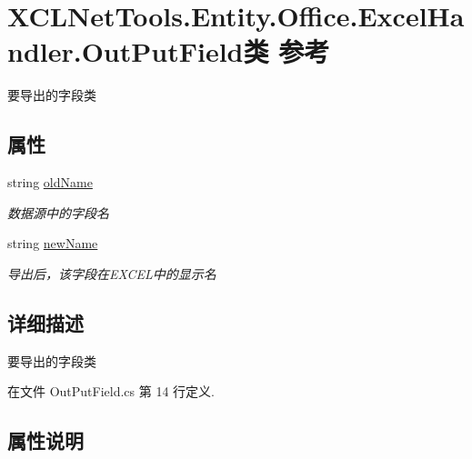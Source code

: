 \hypertarget{class_x_c_l_net_tools_1_1_entity_1_1_office_1_1_excel_handler_1_1_out_put_field}{}\section{X\+C\+L\+Net\+Tools.\+Entity.\+Office.\+Excel\+Handler.\+Out\+Put\+Field类 参考}
\label{class_x_c_l_net_tools_1_1_entity_1_1_office_1_1_excel_handler_1_1_out_put_field}


要导出的字段类  


\subsection*{属性}
\begin{DoxyCompactItemize}
\item 
string \hyperlink{class_x_c_l_net_tools_1_1_entity_1_1_office_1_1_excel_handler_1_1_out_put_field_a6f62cc17246410ac6f6a352cd04bc1a2}{old\+Name}
\begin{DoxyCompactList}\small\item\em 数据源中的字段名 \end{DoxyCompactList}\item 
string \hyperlink{class_x_c_l_net_tools_1_1_entity_1_1_office_1_1_excel_handler_1_1_out_put_field_a5889d2738a4a65d809b67457e37429fd}{new\+Name}
\begin{DoxyCompactList}\small\item\em 导出后，该字段在\+E\+X\+C\+E\+L中的显示名 \end{DoxyCompactList}\end{DoxyCompactItemize}


\subsection{详细描述}
要导出的字段类 



在文件 Out\+Put\+Field.\+cs 第 14 行定义.



\subsection{属性说明}
\mbox{\label{class_x_c_l_net_tools_1_1_entity_1_1_office_1_1_excel_handler_1_1_out_put_field_a5889d2738a4a65d809b67457e37429fd}} 
